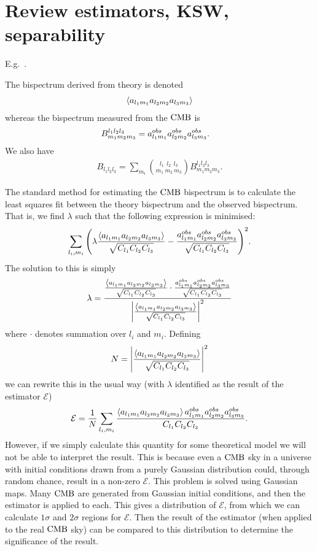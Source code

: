     \section{Review estimators, KSW, separability}
    E.g.~\cite{Smith_2011, Komatsu_2005}.


    The bispectrum derived from theory is denoted
    \begin{align}
        \left<a_{l_1m_1}a_{l_2m_2}a_{l_3m_3}\right>
    \end{align}
    whereas the bispectrum measured from the $\text{CMB}$ is
    \begin{align}
        B^{l_1l_2l_3}_{m_1m_2m_3} &= a^{obs}_{l_1m_1}a^{obs}_{l_2m_2}a^{obs}_{l_3m_3}.
    \end{align}
    We also have
    \begin{align}\label{eq:bll}
        B_{l_1l_2l_3} = \sum_{m_i} {{l_1~~l_2~~l_3} \choose {m_1~m_2~m_3}} B^{l_1l_2l_3}_{m_1m_2m_3}.
    \end{align}


    The standard method for estimating the $\text{CMB}$ bispectrum is to calculate the least squares
    fit between the theory bispectrum and the observed bispectrum. That is, we find $\lambda$
    such that the following expression is minimised:
    \begin{align}
        \sum_{l_i,m_i}{\left(\lambda\frac{\left<a_{l_1m_1}a_{l_2m_2}a_{l_3m_3}\right>}{\sqrt{C_{l_1}C_{l_2}C_{l_3}}}
                - \frac{a^{obs}_{l_1m_1}a^{obs}_{l_2m_2}a^{obs}_{l_3m_3}}{\sqrt{C_{l_1}C_{l_2}C_{l_3}}}\right)}^2.
    \end{align}
    The solution to this is simply
    \begin{align}
        \lambda = \frac{\frac{\left<a_{l_1m_1}a_{l_2m_2}a_{l_3m_3}\right>}{\sqrt{C_{l_1}C_{l_2}C_{l_3}}}\cdot\frac{a^{obs}_{l_1m_1}a^{obs}_{l_2m_2}a^{obs}_{l_3m_3}}{\sqrt{C_{l_1}C_{l_2}C_{l_3}}}}{\left|\frac{\left<a_{l_1m_1}a_{l_2m_2}a_{l_3m_3}\right>}{\sqrt{C_{l_1}C_{l_2}C_{l_3}}}\right|^2}
    \end{align}
    where $\cdot$ denotes summation over $l_i$ and $m_i$.
    Defining
    \begin{align}
        N = \left|\frac{\left<a_{l_1m_1}a_{l_2m_2}a_{l_3m_3}\right>}{\sqrt{C_{l_1}C_{l_2}C_{l_3}}}\right|^2
    \end{align}
    we can rewrite this in the usual way (with $\lambda$ identified as the result of the estimator $\mathcal{E}$)
    \begin{align}
        \mathcal{E} = \frac{1}{N}\sum_{l_i,m_i}\frac{\left<a_{l_1m_1}a_{l_2m_2}a_{l_3m_3}\right>a^{obs}_{l_1m_1}a^{obs}_{l_2m_2}a^{obs}_{l_3m_3}}{C_{l_1}C_{l_2}C_{l_3}}.
    \end{align}
    However, if we simply calculate this quantity for some theoretical model we will not be able to
    interpret the result. This is because even a $\text{CMB}$ sky in a universe with initial conditions
    drawn from a purely Gaussian distribution could, through random chance,
    result in a non-zero $\mathcal{E}$. This problem is solved using Gaussian maps.
    Many $\text{CMB}$ are generated from Gaussian initial conditions, and then the estimator
    is applied to each. This gives a distribution of $\mathcal{E}$, from which we can
    calculate $1\sigma$ and $2\sigma$ regions for $\mathcal{E}$. Then the result of the
    estimator (when applied to the real $\text{CMB}$ sky) can be compared to this distribution
    to determine the significance of the result.



